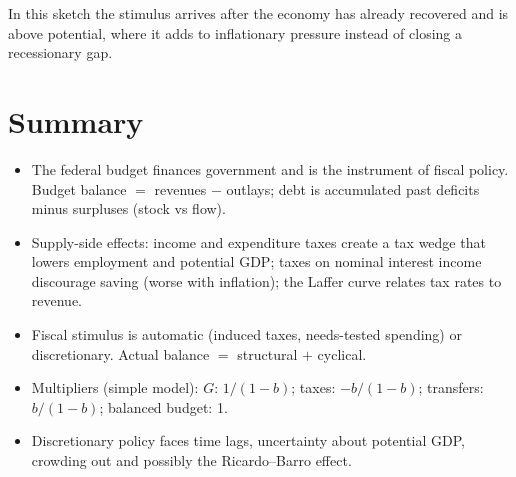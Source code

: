\begin{center}
\end{center}
In this sketch the stimulus arrives after the economy has already recovered and is above
potential, where it adds to inflationary pressure instead of closing a recessionary gap.

\section{Summary}

\begin{itemize}
  \item The federal budget finances government and is the instrument of fiscal policy.
        Budget balance $=$ revenues $-$ outlays; debt is accumulated past deficits minus
        surpluses (stock vs flow).
  \item Supply-side effects: income and expenditure taxes create a tax wedge that lowers
        employment and potential GDP; taxes on nominal interest income discourage saving
        (worse with inflation); the Laffer curve relates tax rates to revenue.
  \item Fiscal stimulus is automatic (induced taxes, needs-tested spending) or
        discretionary. Actual balance $=$ structural $+$ cyclical.
  \item Multipliers (simple model): $G$: $1/(1 - b)$; taxes: $-b/(1 - b)$; transfers:
        $b/(1 - b)$; balanced budget: 1.
  \item Discretionary policy faces time lags, uncertainty about potential GDP, crowding out
        and possibly the Ricardo--Barro effect.
\end{itemize}
